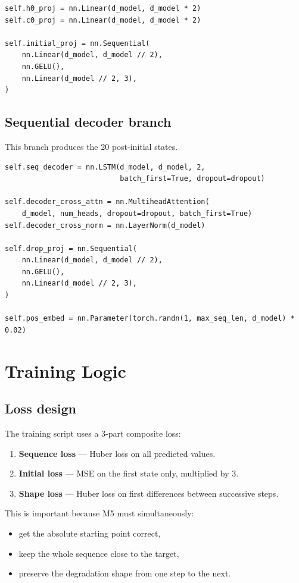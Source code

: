 \documentclass[11pt,a4paper]{article}
\begin{document}
\begin{lstlisting}
self.h0_proj = nn.Linear(d_model, d_model * 2)
self.c0_proj = nn.Linear(d_model, d_model * 2)

self.initial_proj = nn.Sequential(
    nn.Linear(d_model, d_model // 2),
    nn.GELU(),
    nn.Linear(d_model // 2, 3),
)
\end{lstlisting}

\subsection*{Sequential decoder branch}
This branch produces the 20 post-initial states.

\begin{lstlisting}
self.seq_decoder = nn.LSTM(d_model, d_model, 2,
                           batch_first=True, dropout=dropout)

self.decoder_cross_attn = nn.MultiheadAttention(
    d_model, num_heads, dropout=dropout, batch_first=True)
self.decoder_cross_norm = nn.LayerNorm(d_model)

self.drop_proj = nn.Sequential(
    nn.Linear(d_model, d_model // 2),
    nn.GELU(),
    nn.Linear(d_model // 2, 3),
)

self.pos_embed = nn.Parameter(torch.randn(1, max_seq_len, d_model) * 0.02)
\end{lstlisting}

\section{Training Logic}

\subsection*{Loss design}
The training script uses a 3-part composite loss:

\begin{enumerate}[nosep]
    \item \textbf{Sequence loss} --- Huber loss on all predicted values.
    \item \textbf{Initial loss} --- MSE on the first state only, multiplied by 3.
    \item \textbf{Shape loss} --- Huber loss on first differences between successive steps.
\end{enumerate}

This is important because M5 must simultaneously:
\begin{itemize}[nosep]
    \item get the absolute starting point correct,
    \item keep the whole sequence close to the target,
    \item preserve the degradation shape from one step to the next.
\end{itemize}
\end{document}
